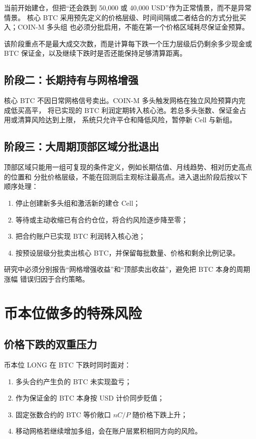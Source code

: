 \documentclass[11pt,a4paper,fontset=none]{ctexart}
\begin{document}
当前开始建仓，但把“还会跌到 50,000 或 40,000 USD”作为正常情景，而不是异常情景。
核心 BTC 采用预先定义的价格层级、时间间隔或二者结合的方式分批买入；COIN-M 多头组
也必须分批启用，不能在第一个价格区域耗尽保证金预算。

该阶段重点不是最大成交次数，而是计算每下跌一个压力层级后仍剩余多少现金或 BTC
保证金，以及继续下跌时是否还能保持足够清算距离。

\subsection{阶段二：长期持有与网格增强}

核心 BTC 不因日常网格信号卖出。COIN-M 多头触发网格在独立风险预算内完成低买高平，
将已实现的 BTC 利润定期转入核心池。若总多头张数、保证金占用或清算风险达到上限，
系统只允许平仓和降低风险，暂停新 Cell 与新组。

\subsection{阶段三：大周期顶部区域分批退出}

顶部区域只能用一组可复现的条件定义，例如长期估值、月线趋势、相对历史高点的位置和
分批价格层级，不能在回测后主观标注最高点。进入退出阶段后按以下顺序处理：

\begin{enumerate}
  \item 停止创建新多头组和激活新的建仓 Cell；
  \item 等待或主动收缩已有合约仓位，将合约风险逐步降至零；
  \item 把合约账户已实现 BTC 利润转入核心池；
  \item 按预设层级分批卖出核心 BTC，并保留每批数量、价格和剩余比例记录。
\end{enumerate}

研究中必须分别报告“网格增强收益”和“顶部卖出收益”，避免把 BTC 本身的周期涨幅
错误归因于合约策略。

\section{币本位做多的特殊风险}

\subsection{价格下跌的双重压力}

币本位 LONG 在 BTC 下跌时同时面对：

\begin{enumerate}
  \item 多头合约产生负的 BTC 未实现盈亏；
  \item 作为保证金的 BTC 本身按 USD 计价同步贬值；
  \item 固定张数合约的 BTC 等价敞口 $nC/P$ 随价格下跌上升；
  \item 移动网格若继续增加多组，会在账户层累积相同方向的风险。
\end{enumerate}
\end{document}
